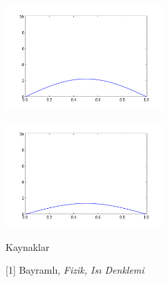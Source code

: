 \documentclass[12pt,fleqn]{article}\usepackage{../../common}
\begin{document}
\includegraphics[height=4cm]{heat-2-60.png}

\includegraphics[height=4cm]{heat-2-80.png}

Kaynaklar

[1] Bayramlı, {\em Fizik, Isı Denklemi}
\end{document}
